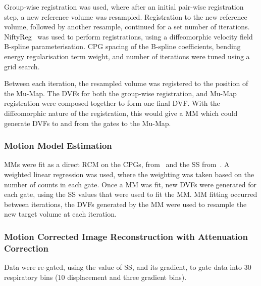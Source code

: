                 Group-wise registration was used, where after an initial pair-wise registration step, a new reference volume was resampled. Registration to the new reference volume, followed by another resample, continued for a set number of iterations. NiftyReg~\parencite{Modat2010} was used to perform registrations, using a diffeomorphic velocity field B-spline parameterisation. \gls{CPG} spacing of the B-spline coefficients, bending energy regularisation term weight, and number of iterations were tuned using a grid search.
                
                Between each iteration, the resampled volume was registered to the position of the \gls{Mu-Map}. The \glspl{DVF} for both the group-wise registration, and \gls{Mu-Map} registration were composed together to form one final \gls{DVF}. With the diffeomorphic nature of the registration, this would give a \gls{MM} which could generate \glspl{DVF} to and from the gates to the \gls{Mu-Map}.
            
            \subsubsection{Motion Model Estimation} \label{sec:pet_ct_motion_correction_exploiting_motion_models_fit_on_coarsely_gated_data_applied_to_finely_gated_data_methods_motion_model_estimation}
                \glspl{MM} were fit as a direct \gls{RCM} on the \glspl{CPG}, from~ and the \gls{SS} from~. A weighted linear regression was used, where the weighting was taken based on the number of counts in each gate. Once a \gls{MM} was fit, new \glspl{DVF} were generated for each gate, using the \gls{SS} values that were used to fit the \gls{MM}. \gls{MM} fitting occurred between iterations, the \glspl{DVF} generated by the \gls{MM} were used to resample the new target volume at each iteration.
            
            \subsubsection{Motion Corrected Image Reconstruction with Attenuation Correction} \label{sec:pet_ct_motion_correction_exploiting_motion_models_fit_on_coarsely_gated_data_applied_to_finely_gated_data_methods_mc_image_reconstruction_with_ac}
                Data were re-gated, using the value of \gls{SS}, and its gradient, to gate data into $30$ respiratory bins ($10$ displacement and three gradient bins).
                
